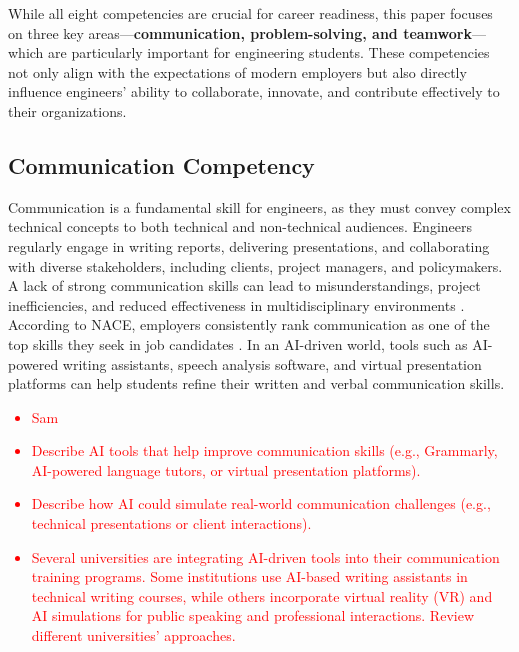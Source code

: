 \documentclass[conference]{IEEEtran}
\begin{document}
While all eight competencies are crucial for career readiness, this paper focuses on three key areas—\textbf{communication, problem-solving, and teamwork}—which are particularly important for engineering students. These competencies not only align with the expectations of modern employers but also directly influence engineers’ ability to collaborate, innovate, and contribute effectively to their organizations.

\subsection{Communication Competency}
Communication is a fundamental skill for engineers, as they must convey complex technical concepts to both technical and non-technical audiences. Engineers regularly engage in writing reports, delivering presentations, and collaborating with diverse stakeholders, including clients, project managers, and policymakers. A lack of strong communication skills can lead to misunderstandings, project inefficiencies, and reduced effectiveness in multidisciplinary environments \cite{irish2013engineering}. According to NACE, employers consistently rank communication as one of the top skills they seek in job candidates \cite{nace2025competencies}. In an AI-driven world, tools such as AI-powered writing assistants, speech analysis software, and virtual presentation platforms can help students refine their written and verbal communication skills.
\textcolor{red}{
\begin{itemize}
    \item Sam
    \item Describe AI tools that help improve communication skills (e.g., Grammarly, AI-powered language tutors, or virtual presentation platforms).
    \item Describe how AI could simulate real-world communication challenges (e.g., technical presentations or client interactions).
    \item Several universities are integrating AI-driven tools into their communication training programs. Some institutions use AI-based writing assistants in technical writing courses, while others incorporate virtual reality (VR) and AI simulations for public speaking and professional interactions. Review different universities' approaches.
\end{itemize}
}
\end{document}
